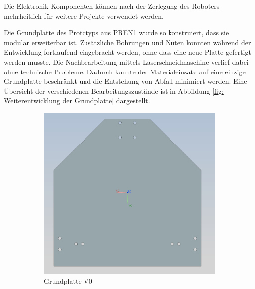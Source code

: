 Die Elektronik-Komponenten können nach der Zerlegung des Roboters mehrheitlich für weitere Projekte verwendet werden.

Die Grundplatte des Prototyps aus PREN1 wurde so konstruiert, dass sie modular erweiterbar ist. Zusätzliche Bohrungen und Nuten konnten während der Entwicklung fortlaufend eingebracht werden, ohne dass eine neue Platte gefertigt werden musste. Die Nachbearbeitung mittels Laserschneidmaschine verlief dabei ohne technische Probleme. Dadurch konnte der Materialeinsatz auf eine einzige Grundplatte beschränkt und die Entstehung von Abfall minimiert werden. Eine Übersicht der verschiedenen Bearbeitungszustände ist in Abbildung \ref{fig: Weiterentwicklung der Grundplatte} dargestellt.

\begin{figure}[H] %
    \centering
    \begin{subfigure}[b]{0.45\textwidth}
        \centering
        \includegraphics[width=\linewidth]{assets/MT/Grundplatte_V0.png}
        \caption{Grundplatte V0}
    \end{subfigure}
    \hfill
    \begin{subfigure}[b]{0.45\textwidth}
        \centering

\end{subfigure}
\end{figure}
